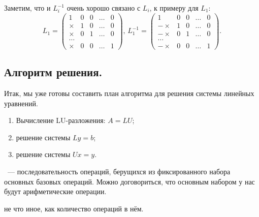 \begin{remark}
	Заметим, что и $L_{i}^{-1}$ очень хорошо связано с $L_{i}$, к примеру для $L_1$:
	\[
		L_1 = \left(
		\begin{array}{ccccc}
				1      & 0 & 0 & \ldots & 0 \\
				\times & 1 & 0 & \ldots & 0 \\
				\times & 0 & 1 & \ldots & 0 \\
				\ldots &                    \\
				\times & 0 & 0 & \ldots & 1
			\end{array}
		\right),\,
		L_1^{-1} = \left(
		\begin{array}{ccccc}
				1       & 0 & 0 & \ldots & 0 \\
				-\times & 1 & 0 & \ldots & 0 \\
				-\times & 0 & 1 & \ldots & 0 \\
				\ldots  &                    \\
				-\times & 0 & 0 & \ldots & 1
			\end{array}
		\right).
	\]
\end{remark}

\subsection{Алгоритм решения.}

Итак, мы уже готовы составить план алгоритма для решения системы линейных уравнений.

\begin{enumerate}[label=\protect\circled{\arabic*}]
	\item Вычисление LU-разложения: $A=LU$;
	\item решение системы $Ly=b$;
	\item решение системы $Ux=y$.
\end{enumerate}

\begin{definition}
	~--- последовательность операций, берущихся из фиксированного набора основных базовых
	операций. Можно договориться, что основным набором у нас будут арифметические операции.
\end{definition}

\begin{definition}
	 не что иное, как количество операций в нём.
\end{definition}

